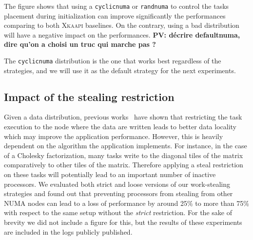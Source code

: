 \documentclass{Styles/llncs}
\newcommand{\kaapi}{\textsc{\mbox{Xkaapi}}\xspace}
\newcommand{\PV}[1]{{\color{red}\bfseries PV: #1}}
\begin{document}
The figure shows that using a \verb/cyclicnuma/ or \verb/randnuma/ to control
the tasks placement during initialization can improve significantly the performances
comparing to both \kaapi baselines.
On the contrary, using a bad distribution will have a negative impact on the performances.
\PV{décrire defaultnuma, dire qu'on a choisi un truc qui marche pas ?}

The \verb/cyclicnuma/ distribution is the one that works best regardless of
the strategies, and we will use it as the default strategy for the next experiments.



\subsection{Impact of the stealing restriction}

Given a data distribution, previous works~\cite{Olivier:2012:CMW:2388996.2389085}
have shown that restricting the task execution to the node where the data are
written leads to better data locality which may improve the application performance.
However, this is heavily dependent on the algorithm the application implements. For instance, in the case
of a Cholesky factorization, many tasks write to the diagonal tiles
of the matrix comparatively to other tiles of the matrix. Therefore applying
a steal restriction on these tasks will potentially lead to an important number
of inactive processors.
We evaluated both strict and loose versions of our work-stealing strategies and found
out that preventing processors from stealing from other NUMA nodes can lead to a loss of performance by
around 25\% to more than 75\% with respect to the same setup without the \emph{strict}
restriction.
For the sake of brevity we did not include a figure for this, but the results of these
experiments are included in the logs publicly published.
\end{document}
